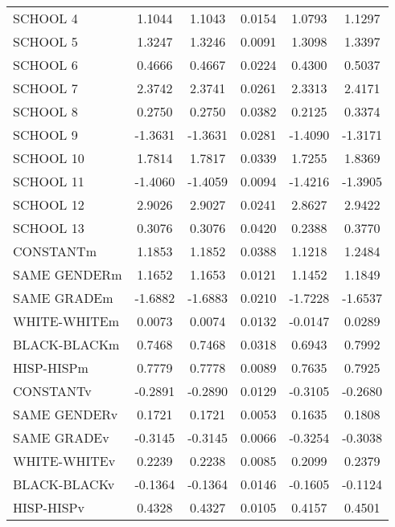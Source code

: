 \documentclass[12pt,letterpaper]{article}
\begin{document}
\begin{small}
\begin{table}[ht]
\begin{tabular}{l|ccccc}
  SCHOOL 4 & 1.1044 & 1.1043 & 0.0154 & 1.0793 & 1.1297 \\ 
  SCHOOL 5 & 1.3247 & 1.3246 & 0.0091 & 1.3098 & 1.3397 \\ 
  SCHOOL 6 & 0.4666 & 0.4667 & 0.0224 & 0.4300 & 0.5037 \\ 
  SCHOOL 7 & 2.3742 & 2.3741 & 0.0261 & 2.3313 & 2.4171 \\ 
  SCHOOL 8 & 0.2750 & 0.2750 & 0.0382 & 0.2125 & 0.3374 \\ 
  SCHOOL 9 & -1.3631 & -1.3631 & 0.0281 & -1.4090 & -1.3171 \\ 
  SCHOOL 10 & 1.7814 & 1.7817 & 0.0339 & 1.7255 & 1.8369 \\ 
  SCHOOL 11 & -1.4060 & -1.4059 & 0.0094 & -1.4216 & -1.3905 \\ 
  SCHOOL 12 & 2.9026 & 2.9027 & 0.0241 & 2.8627 & 2.9422 \\ 
  SCHOOL 13 & 0.3076 & 0.3076 & 0.0420 & 0.2388 & 0.3770 \\ 
  CONSTANTm & 1.1853 & 1.1852 & 0.0388 & 1.1218 & 1.2484 \\ 
  SAME GENDERm & 1.1652 & 1.1653 & 0.0121 & 1.1452 & 1.1849 \\ 
  SAME GRADEm & -1.6882 & -1.6883 & 0.0210 & -1.7228 & -1.6537 \\ 
  WHITE-WHITEm & 0.0073 & 0.0074 & 0.0132 & -0.0147 & 0.0289 \\ 
  BLACK-BLACKm & 0.7468 & 0.7468 & 0.0318 & 0.6943 & 0.7992 \\ 
  HISP-HISPm & 0.7779 & 0.7778 & 0.0089 & 0.7635 & 0.7925 \\ 
  CONSTANTv & -0.2891 & -0.2890 & 0.0129 & -0.3105 & -0.2680 \\ 
  SAME GENDERv & 0.1721 & 0.1721 & 0.0053 & 0.1635 & 0.1808 \\ 
  SAME GRADEv & -0.3145 & -0.3145 & 0.0066 & -0.3254 & -0.3038 \\ 
  WHITE-WHITEv & 0.2239 & 0.2238 & 0.0085 & 0.2099 & 0.2379 \\ 
  BLACK-BLACKv & -0.1364 & -0.1364 & 0.0146 & -0.1605 & -0.1124 \\ 
  HISP-HISPv & 0.4328 & 0.4327 & 0.0105 & 0.4157 & 0.4501 \\ 
   \hline
\end{tabular}
\end{table}






\end{small}
\end{document}
